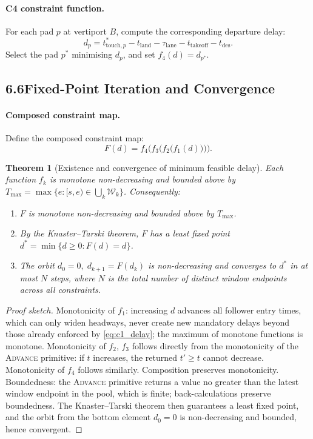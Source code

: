 \documentclass[12pt,a4paper]{article}
\newtheorem{theorem}{Theorem}
\newcommand{\tto}{t_{\mathrm{takeoff}}}
\newcommand{\tland}{t_{\mathrm{land}}}
\newcommand{\lane}{\tau_{\mathrm{lane}}}
\begin{document}
\paragraph{C4 constraint function.}
For each pad $p$ at vertiport $B$, compute the corresponding departure delay:
\begin{equation}
  d_p = t^*_{\mathrm{touch},p} - \tland - \lane - \tto - t_{\mathrm{des}}.
  \label{eq:c4}
\end{equation}
Select the pad $p^*$ minimising $d_p$, and set $f_4(d) = d_{p^*}$.

\bigskip
\subsection*{6.6\quad Fixed-Point Iteration and Convergence}

\paragraph{Composed constraint map.}
Define the composed constraint map:
\begin{equation}
  F(d) = f_4\bigl(f_3\bigl(f_2\bigl(f_1(d)\bigr)\bigr)\bigr).
  \label{eq:F}
\end{equation}

\begin{theorem}[Existence and convergence of minimum feasible delay]
\label{thm:convergence}
Each function $f_k$ is monotone non-decreasing and bounded above by
$T_{\max} = \max\{e : [s,e)\in \bigcup_k \mathcal{W}_k\}$.  Consequently:
\begin{enumerate}[label=(\roman*)]
  \item $F$ is monotone non-decreasing and bounded above by $T_{\max}$.
  \item By the Knaster--Tarski theorem, $F$ has a least fixed point
    $d^* = \min\{d \ge 0 : F(d) = d\}$.
  \item The orbit $d_0 = 0,\; d_{k+1} = F(d_k)$ is non-decreasing and
    converges to $d^*$ in at most $N$ steps, where $N$ is the total number
    of distinct window endpoints across all constraints.
\end{enumerate}
\end{theorem}

\begin{proof}[Proof sketch]
Monotonicity of $f_1$: increasing $d$ advances all follower entry times,
which can only widen headways, never create new mandatory delays beyond those
already enforced by \eqref{eq:c1_delay}; the maximum of monotone functions
is monotone.  Monotonicity of $f_2$, $f_3$ follows directly from the
monotonicity of the \textsc{Advance} primitive: if $t$ increases, the
returned $t' \ge t$ cannot decrease.  Monotonicity of $f_4$ follows
similarly.  Composition preserves monotonicity.  Boundedness: the
\textsc{Advance} primitive returns a value no greater than the latest window
endpoint in the pool, which is finite; back-calculations preserve
boundedness.  The Knaster--Tarski theorem then guarantees a least fixed
point, and the orbit from the bottom element $d_0 = 0$ is non-decreasing
and bounded, hence convergent.
\end{proof}
\end{document}
